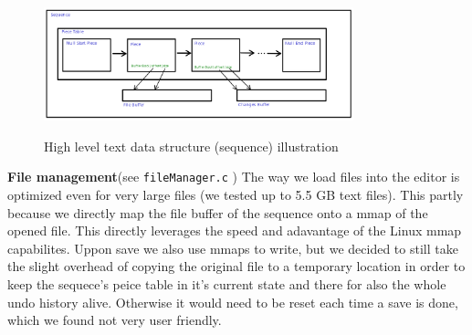 \begin{figure}[H]
\caption{High level text data structure (sequence) illustration}
\centering
\includegraphics[width=0.8\textwidth]{./images/sequenceIllustration.png}
\label{fig:sequence}
\end{figure}

\textbf{File management}(see \verb|fileManager.c| \cite{GithubRepo}) The way we load files into the editor is optimized even for very large files (we tested up to 5.5 GB text files). This partly because we directly map the file buffer of the sequence onto a mmap of the opened file. This directly leverages the speed and adavantage of the Linux mmap capabilites. Uppon save we also use mmaps to write, but we decided to still take the slight overhead of copying the original file to a temporary location in order to keep the sequece's peice table in it's current state and there for also the whole undo history alive. Otherwise it would need to be reset each time a save is done, which we found not very user friendly. %

